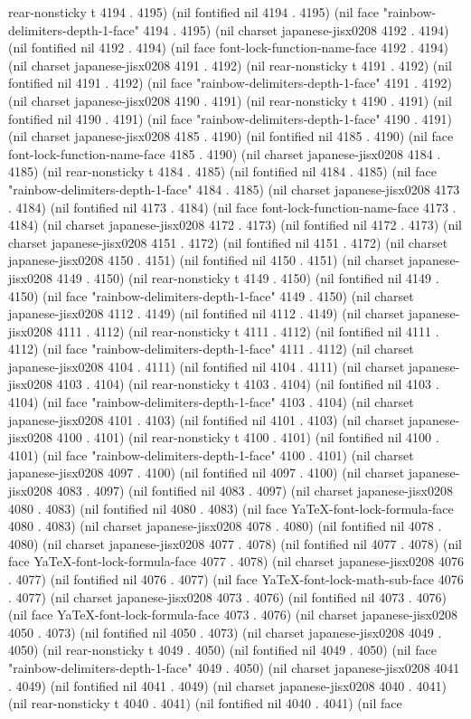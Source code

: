 rear-nonsticky t 4194 . 4195) (nil fontified nil 4194 . 4195) (nil face "rainbow-delimiters-depth-1-face" 4194 . 4195) (nil charset japanese-jisx0208 4192 . 4194) (nil fontified nil 4192 . 4194) (nil face font-lock-function-name-face 4192 . 4194) (nil charset japanese-jisx0208 4191 . 4192) (nil rear-nonsticky t 4191 . 4192) (nil fontified nil 4191 . 4192) (nil face "rainbow-delimiters-depth-1-face" 4191 . 4192) (nil charset japanese-jisx0208 4190 . 4191) (nil rear-nonsticky t 4190 . 4191) (nil fontified nil 4190 . 4191) (nil face "rainbow-delimiters-depth-1-face" 4190 . 4191) (nil charset japanese-jisx0208 4185 . 4190) (nil fontified nil 4185 . 4190) (nil face font-lock-function-name-face 4185 . 4190) (nil charset japanese-jisx0208 4184 . 4185) (nil rear-nonsticky t 4184 . 4185) (nil fontified nil 4184 . 4185) (nil face "rainbow-delimiters-depth-1-face" 4184 . 4185) (nil charset japanese-jisx0208 4173 . 4184) (nil fontified nil 4173 . 4184) (nil face font-lock-function-name-face 4173 . 4184) (nil charset japanese-jisx0208 4172 . 4173) (nil fontified nil 4172 . 4173) (nil charset japanese-jisx0208 4151 . 4172) (nil fontified nil 4151 . 4172) (nil charset japanese-jisx0208 4150 . 4151) (nil fontified nil 4150 . 4151) (nil charset japanese-jisx0208 4149 . 4150) (nil rear-nonsticky t 4149 . 4150) (nil fontified nil 4149 . 4150) (nil face "rainbow-delimiters-depth-1-face" 4149 . 4150) (nil charset japanese-jisx0208 4112 . 4149) (nil fontified nil 4112 . 4149) (nil charset japanese-jisx0208 4111 . 4112) (nil rear-nonsticky t 4111 . 4112) (nil fontified nil 4111 . 4112) (nil face "rainbow-delimiters-depth-1-face" 4111 . 4112) (nil charset japanese-jisx0208 4104 . 4111) (nil fontified nil 4104 . 4111) (nil charset japanese-jisx0208 4103 . 4104) (nil rear-nonsticky t 4103 . 4104) (nil fontified nil 4103 . 4104) (nil face "rainbow-delimiters-depth-1-face" 4103 . 4104) (nil charset japanese-jisx0208 4101 . 4103) (nil fontified nil 4101 . 4103) (nil charset japanese-jisx0208 4100 . 4101) (nil rear-nonsticky t 4100 . 4101) (nil fontified nil 4100 . 4101) (nil face "rainbow-delimiters-depth-1-face" 4100 . 4101) (nil charset japanese-jisx0208 4097 . 4100) (nil fontified nil 4097 . 4100) (nil charset japanese-jisx0208 4083 . 4097) (nil fontified nil 4083 . 4097) (nil charset japanese-jisx0208 4080 . 4083) (nil fontified nil 4080 . 4083) (nil face YaTeX-font-lock-formula-face 4080 . 4083) (nil charset japanese-jisx0208 4078 . 4080) (nil fontified nil 4078 . 4080) (nil charset japanese-jisx0208 4077 . 4078) (nil fontified nil 4077 . 4078) (nil face YaTeX-font-lock-formula-face 4077 . 4078) (nil charset japanese-jisx0208 4076 . 4077) (nil fontified nil 4076 . 4077) (nil face YaTeX-font-lock-math-sub-face 4076 . 4077) (nil charset japanese-jisx0208 4073 . 4076) (nil fontified nil 4073 . 4076) (nil face YaTeX-font-lock-formula-face 4073 . 4076) (nil charset japanese-jisx0208 4050 . 4073) (nil fontified nil 4050 . 4073) (nil charset japanese-jisx0208 4049 . 4050) (nil rear-nonsticky t 4049 . 4050) (nil fontified nil 4049 . 4050) (nil face "rainbow-delimiters-depth-1-face" 4049 . 4050) (nil charset japanese-jisx0208 4041 . 4049) (nil fontified nil 4041 . 4049) (nil charset japanese-jisx0208 4040 . 4041) (nil rear-nonsticky t 4040 . 4041) (nil fontified nil 4040 . 4041) (nil face 